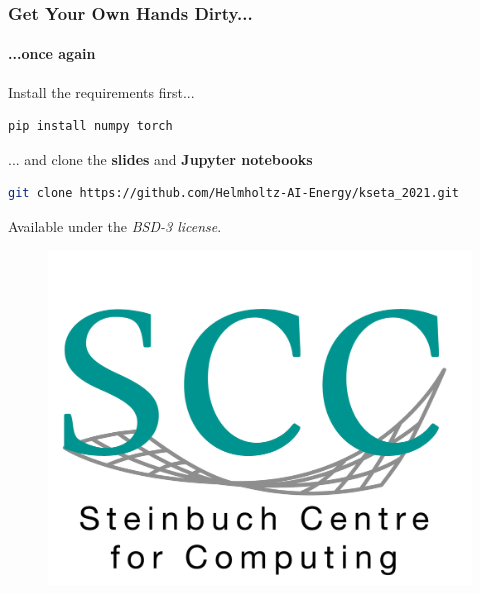 \documentclass[aspectratio=1610]{beamer}
\begin{document}
\begin{frame}[fragile]
    \frametitle{Get Your Own Hands Dirty...}
    \framesubtitle{...once again}
    
    \vspace{2em}
    Install the requirements first...
    \begin{lstlisting}[language=Bash]
pip install numpy torch
    \end{lstlisting}
    \vspace{1em}
    ... and clone the \textbf{slides} and \textbf{Jupyter notebooks}
    \begin{lstlisting}[language=Bash]
git clone https://github.com/Helmholtz-AI-Energy/kseta_2021.git
    \end{lstlisting}
    \vspace{1em}
    Available under the \emph{BSD-3 license}.
    
    \vspace{1em}
    \begin{figure}
        \centering
        \includegraphics[height=0.25\textheight]{logos/scc.png}
    \end{figure}
\end{frame}
\end{document}
